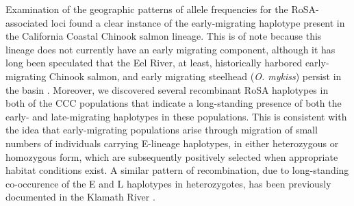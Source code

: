 Examination of the geographic patterns of allele frequencies for the RoSA-associated loci found a
clear instance of the early-migrating haplotype present in the California Coastal Chinook salmon lineage.
This is of note because this lineage does not currently have an early migrating component, although it
has long been speculated that the Eel River, at least, historically harbored early-migrating Chinook salmon,
and early migrating steelhead ({\em O. mykiss}) persist in the basin \citep{bjorkstedt2005analysis}. Moreover, we
discovered several recombinant RoSA haplotypes in both of the CCC populations that indicate a long-standing
presence of both the early- and late-migrating haplotypes in these populations. This is consistent with the
idea that early-migrating populations arise through migration of small numbers of individuals carrying 
E-lineage haplotypes, in either heterozygous or homozygous form, which are subsequently positively selected
when appropriate habitat conditions exist. A similar pattern of recombination, due to long-standing
co-occurence of the E and L haplotypes in heterozygotes, has been previously documented in the Klamath 
River \citep{thompson2020complex}.




